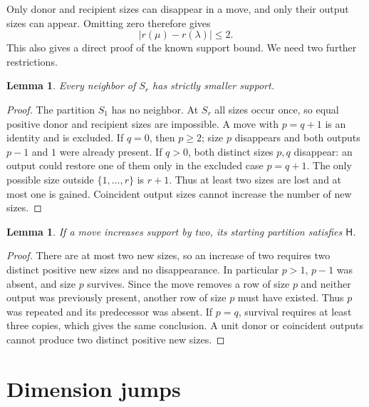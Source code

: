 \documentclass[11pt]{article}
\newtheorem{lemma}[theorem]{Lemma}
\newcommand{\HH}{\mathsf{H}}
\begin{document}
Only donor and recipient sizes can disappear in a move, and only their
output sizes can appear. Omitting zero therefore gives
\begin{equation}\label{eq:support-bound}
 |r(\mu)-r(\lambda)|\leq2.
\end{equation}
This also gives a direct proof of the known support bound. We need two
further restrictions.

\begin{lemma}\label{lem:staircase}
Every neighbor of $S_r$ has strictly smaller support.
\end{lemma}
\begin{proof}
The partition $S_1$ has no neighbor. At $S_r$ all sizes occur once, so
equal positive donor and recipient sizes are impossible. A move with
$p=q+1$ is an identity and is excluded. If $q=0$, then $p\geq2$;
size $p$ disappears and both outputs $p-1$ and $1$ were already present.
If $q>0$, both distinct sizes $p,q$ disappear: an output could restore
one of them only in the excluded case $p=q+1$. The only possible size
outside $\{1,\ldots,r\}$ is $r+1$. Thus at least two sizes are lost
and at most one is gained. Coincident output sizes cannot increase the
number of new sizes.
\end{proof}

\begin{lemma}\label{lem:two-births}
If a move increases support by two, its starting partition satisfies $\HH$.
\end{lemma}
\begin{proof}
There are at most two new sizes, so an increase of two requires two
distinct positive new sizes and no disappearance. In particular $p>1$,
$p-1$ was absent, and size $p$ survives. Since the move removes a row of
size $p$ and neither output was previously present, another row of size
$p$ must have existed. Thus $p$ was repeated and its predecessor was
absent. If $p=q$, survival requires at least three copies, which gives the
same conclusion. A unit donor or coincident outputs cannot produce two
distinct positive new sizes.
\end{proof}

\section{Dimension jumps}
\end{document}
